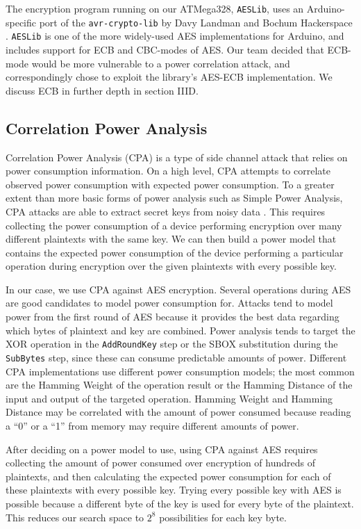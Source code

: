 \documentclass[journal]{ieee_style}
\begin{document}
The encryption program running on our ATMega328, \texttt{AESLib}, uses an Arduino-specific port of the \texttt{avr-crypto-lib} by Davy Landman and Bochum Hackerspace \cite{AESLib} \cite{daslabor}. \texttt{AESLib} is one of the more widely-used AES implementations for Arduino, and includes support for ECB and CBC-modes of AES. Our team decided that ECB-mode would be more vulnerable to a power correlation attack, and correspondingly chose to exploit the library's AES-ECB implementation. We discuss ECB in further depth in section IIID.

\subsection{Correlation Power Analysis}
Correlation Power Analysis (CPA) is a type of side channel attack that relies on power consumption information. On a high level, CPA attempts to correlate observed power consumption with expected power consumption. To a greater extent than more basic forms of power analysis such as Simple Power Analysis, CPA attacks are able to extract secret keys from noisy data \cite{cpa}. This requires collecting the power consumption of a device performing encryption over many different plaintexts with the same key. We can then build a power model that contains the expected power consumption of the device performing a particular operation during encryption over the given plaintexts with every possible key. 

In our case, we use CPA against AES encryption. Several operations during AES are good candidates to model power consumption for. Attacks tend to model power from the first round of AES because it provides the best data regarding which bytes of plaintext and key are combined. Power analysis tends to target the XOR operation in the \texttt{AddRoundKey} step or the SBOX substitution during the \texttt{SubBytes} step, since these can consume predictable amounts of power. Different CPA implementations use different power consumption models; the most common are the Hamming Weight of the operation result or the Hamming Distance of the input and output of the targeted operation. Hamming Weight and Hamming Distance may be correlated with the amount of power consumed because reading a ``0'' or a ``1'' from memory may require different amounts of power.
 
After deciding on a power model to use, using CPA against AES requires collecting the amount of power consumed over encryption of hundreds of plaintexts, and then calculating the expected power consumption for each of these plaintexts with every possible key. Trying every possible key with AES is possible because a different byte of the key is used for every byte of the plaintext. This reduces our search space to $2^8$ possibilities for each key byte. 
\end{document}

